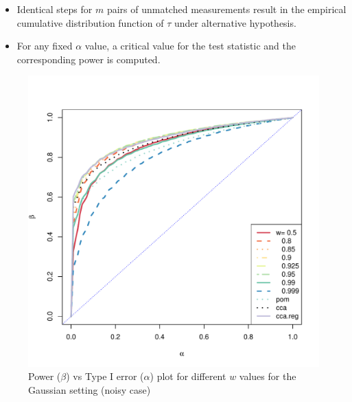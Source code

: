 \documentclass[12pt,oneside,final]{thesis}\usepackage[]{graphicx}\usepackage[]{color}
\begin{document}
\begin{itemize}
\item Identical steps for $m$ pairs of unmatched measurements result in the empirical cumulative distribution  function of $\tau$ under alternative hypothesis.
\item For any fixed $\alpha$ value, a critical value for the test statistic and the corresponding power is computed.
\end{itemize}



\begin{figure}
\includegraphics[scale=0.75]{MVN-FC-Tradeoff-OOS-c0_01.pdf}
\caption{Power ($\beta$) vs Type I error ($\alpha$) plot for different $w$ values for the Gaussian setting (noisy case)}
\label{fig:MVN-c001-power-alpha}
\end{figure}
\end{document}

